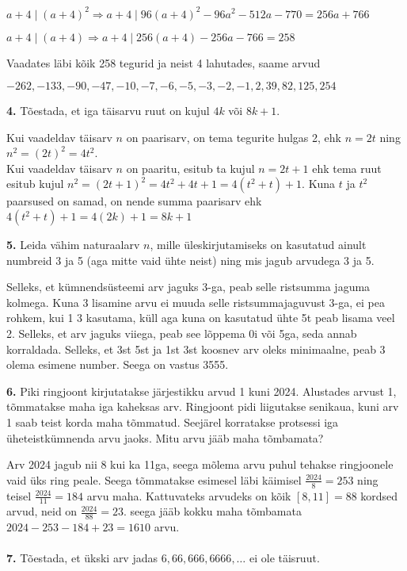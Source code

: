 \documentclass[a4paper, 10pt]{article}
\begin{document}
$a+4 \mid (a+4)^2\Rightarrow a+4\mid96(a+4)^2-96a^2-512a-770=256a+766$

$a+4 \mid (a+4)\Rightarrow a+4\mid256(a+4)-256a-766=258$

Vaadates läbi kõik 258 tegurid ja neist 4 lahutades, saame arvud 

$-262,-133,-90,-47,-10,-7,-6,-5,-3,-2,-1,2,39,82,125,254$\\
\bigskip

\noindent \textbf{4.} Tõestada, et iga täisarvu ruut on kujul $4k$ või $8k+1$.
\bigskip

Kui vaadeldav täisarv $n$ on paarisarv, on tema tegurite hulgas 2, ehk $n=2t$ ning $n^2=(2t)^2=4t^2$.\\
Kui vaadeldav täisarv $n$ on paaritu, esitub ta kujul $n=2t+1$ ehk tema ruut esitub kujul $n^2=(2t+1)^2=4t^2+4t+1=4(t^2+t)+1$. Kuna $t$ ja $t^2$ paarsused on samad, on nende summa paarisarv ehk $4(t^2+t)+1 = 4(2k)+1=8k+1$
\bigskip

\noindent \textbf{5.} Leida vähim naturaalarv $n$, mille üleskirjutamiseks on kasutatud ainult numbreid 3 ja 5 (aga mitte vaid ühte neist) ning mis jagub arvudega 3 ja 5. 

\bigskip
Selleks, et kümnendsüsteemi arv jaguks 3-ga, peab selle ristsumma jaguma kolmega. Kuna 3 lisamine arvu ei muuda selle ristsummajaguvust 3-ga, ei pea rohkem, kui 1 3 kasutama, küll aga kuna on kasutatud ühte 5t peab lisama veel 2. Selleks, et arv jaguks viiega, peab see lõppema 0i või 5ga, seda annab korraldada. Selleks, et 3st 5st ja 1st 3st koosnev arv oleks minimaalne, peab 3 olema esimene number. Seega on vastus 3555.
\bigskip

\noindent\textbf{6.} Piki ringjoont kirjutatakse järjestikku arvud 1 kuni 2024. Alustades arvust 1, tõmmatakse maha iga kaheksas arv. Ringjoont pidi liigutakse senikaua, kuni arv 1 saab teist korda maha tõmmatud. Seejärel korratakse protsessi iga üheteistkümnenda arvu jaoks. Mitu arvu jääb maha tõmbamata?

\bigskip

Arv 2024 jagub nii 8 kui ka 11ga, seega mõlema arvu puhul tehakse ringjoonele vaid üks ring peale. Seega tõmmatakse esimesel läbi käimisel $\frac{2024}8=253$ ning teisel $\frac{2024}{11}=184$ arvu maha. Kattuvateks arvudeks on kõik $[8,11]=88$ kordsed arvud, neid on $\frac{2024}{88}=23$. seega jääb kokku maha tõmbamata $2024-253-184+23=1610$ arvu.\\\\

\noindent \textbf{7.} Tõestada, et ükski arv jadas $6,66,666,6666, \ldots$ ei ole täisruut. 
\end{document}
